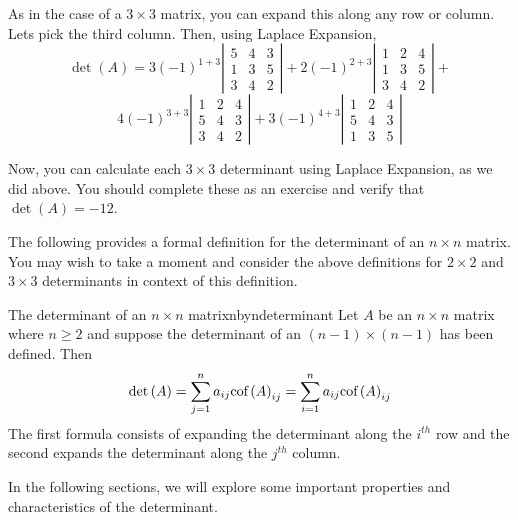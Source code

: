 \begin{solution} As in the case of a $3\times 3$ matrix, you can expand this along any row or
column. Lets pick the third column. Then, using Laplace Expansion, 
\begin{equation*}
\det \left( A\right) 
=
3\left( -1\right) ^{1+3}\left\vert
\begin{array}{rrr}
5 & 4 & 3 \\
1 & 3 & 5 \\
3 & 4 & 2
\end{array}
\right\vert +2\left( -1\right) ^{2+3}\left\vert
\begin{array}{rrr}
1 & 2 & 4 \\
1 & 3 & 5 \\
3 & 4 & 2
\end{array}
\right\vert +
\end{equation*}
\begin{equation*}
4\left( -1\right) ^{3+3}\left\vert
\begin{array}{rrr}
1 & 2 & 4 \\
5 & 4 & 3 \\
3 & 4 & 2
\end{array}
\right\vert +3\left( -1\right) ^{4+3}\left\vert
\begin{array}{rrr}
1 & 2 & 4 \\
5 & 4 & 3 \\
1 & 3 & 5
\end{array}
\right\vert 
\end{equation*}

Now, you can calculate each $3 \times 3$ determinant using Laplace Expansion, as we did above. 
You should complete these as an exercise and verify that $\det \left( A \right)= -12$. 
\end{solution}

The following provides a formal definition for the determinant of an $n \times n$ matrix. You may
wish to take a moment and consider the above definitions for $2 \times 2$ and $3 \times 3$ determinants 
in context of this definition.

\begin{definition}{The determinant of an $n\times n$ matrix}{nbyndeterminant}
Let $A$ be an $n\times n$ matrix where $n\geq 2$ and suppose the
determinant of an $\left( n-1\right) \times \left( n-1\right) $ has been
defined. Then
\begin{equation*}
\det \left( A\right) =\sum_{j=1}^{n}a_{ij}\mbox{cof}\left( A\right)
_{ij}=\sum_{i=1}^{n}a_{ij}\mbox{cof}\left( A\right) _{ij}
\end{equation*}
The first formula consists of expanding the determinant along the $i^{th}$
row and the second expands the determinant along the $j^{th}$ column.
\end{definition}

In the following sections, we will explore some important properties and characteristics of the determinant.
